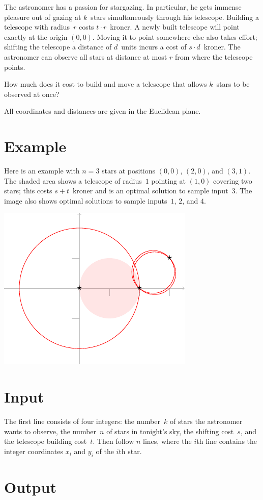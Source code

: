
\noindent
The astronomer has a passion for stargazing.
In particular, he gets immense pleasure out of gazing at $k$~stars simultaneously through his telescope.   
Building a telescope with radius~$r$ costs $t\cdot r$~kroner.
A newly built telescope will point exactly at the origin $(0,0)$.
Moving it to point somewhere else also takes effort; 
shifting the telescope a distance of $d$~units incurs a cost of $s\cdot d$~kroner.
The astronomer can observe all stars at distance at most $r$ from where the telescope points.

How much does it cost to build and move a telescope that allows $k$~stars to be observed at once?

\medskip

All coordinates and distances are given in the Euclidean plane.


\section*{Example}

Here is an example with $n=3$ stars at positions $(0,0)$, $(2,0)$, and $(3,1)$.
The shaded area shows a telescope of radius~$1$ pointing at $(1,0)$ covering two stars; this costs $s + t$~kroner and is an optimal solution to sample input~$3$.
The image also shows optimal solutions to sample inputs~$1$, $2$, and $4$.

\medskip
\noindent
\includegraphics[width=.3\textwidth]{img/samples.pdf}


\section*{Input}

The first line consists of four integers:
the number~$k$ of stars the astronomer wants to observe,
the number~$n$ of stars in tonight's sky,
the shifting cost~$s$, and
the telescope building cost~$t$.
Then follow $n$ lines, where the $i$th line contains the integer coordinates $x_i$ and $y_i$ of the $i$th star.

\section*{Output}

